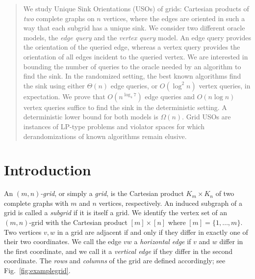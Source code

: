 \documentclass[runningheads,a4paper]{llncs}
\newcommand{\LB}[1]{\marginpar{\parbox{3.6cm}{{\small {\bf LB:} #1}}}} %
\begin{document}
\maketitle
\vspace{-.05in}
\begin{abstract}
\noindent %
 We study Unique Sink Orientations (USOs) of grids: Cartesian products of
  \emph{two} complete graphs on $n$ vertices, where the edges are oriented in such a way that each subgrid has a unique sink.
  We consider two different oracle models, the \emph{edge query} and the
  \emph{vertex query} model.
  An edge query provides the orientation of the queried edge, whereas a vertex query provides the orientation of all edges incident to the queried vertex.
We are interested in bounding the number of queries to the oracle needed by an algorithm to find the sink.
In the randomized setting, the best known algorithms find the sink using either $\Theta(n)$ edge queries, or $O(\log^2 n)$ vertex queries, in expectation. We prove that $O(n^{\log_4 7})$ edge queries and $O(n \log n)$ vertex queries suffice to find the sink in the deterministic setting. A deterministic lower bound for both models is $\Omega(n)$.
Grid USOs are instances of LP-type problems and violator spaces for which derandomizations of known algorithms remain elusive. 

\end{abstract}

\vspace{-.13in}
\section{Introduction} \label{sec:intro}
\vspace{-.05in}
An \emph{$(m,n)$-grid}, or simply a \emph{grid}, is the Cartesian product $K_m \times K_n$ of two complete graphs with $m$ and $n$ vertices, respectively. 
An induced subgraph of a grid is called a \emph{subgrid} if it is itself a grid.
We identify the vertex set of an $(m,n)$-grid with the Cartesian product $[m] \times [n]$ where $[m] = \{1,\ldots,m\}$. Two
vertices $v,w$ in a grid are adjacent if and only if they differ in
exactly one of their two coordinates.
We call the edge $vw$ a \emph{horizontal edge} if $v$ and $w$ differ in the
first coordinate, and we call it a \emph{vertical edge} if they differ in the
second coordinate. The \emph{rows} and \emph{columns} of the grid are defined accordingly; see Fig.~\ref{fig:examplegrid}.
\end{document}
